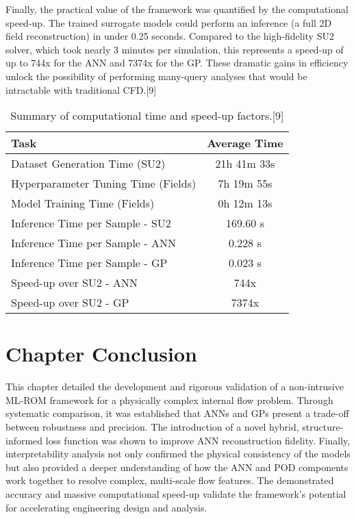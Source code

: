 \documentclass[12pt, a4paper]{report}
\begin{document}
Finally, the practical value of the framework was quantified by the computational speed-up. The trained surrogate models could perform an inference (a full 2D field reconstruction) in under 0.25 seconds. Compared to the high-fidelity SU2 solver, which took nearly 3 minutes per simulation, this represents a speed-up of up to 744x for the ANN and 7374x for the GP. These dramatic gains in efficiency unlock the possibility of performing many-query analyses that would be intractable with traditional CFD.[9]

\begin{table}[htbp]
\centering
\caption{Summary of computational time and speed-up factors.[9]}
\label{tab:nozzle_speedup}
\begin{tabular}{@{}lc@{}}
\toprule
Task & Average Time \\
\midrule
Dataset Generation Time (SU2) & 21h 41m 33s \\
Hyperparameter Tuning Time (Fields) & 7h 19m 55s \\
Model Training Time (Fields) & 0h 12m 13s \\
\midrule
Inference Time per Sample - SU2 & 169.60 s \\
Inference Time per Sample - ANN & 0.228 s \\
Inference Time per Sample - GP & 0.023 s \\
\midrule
Speed-up over SU2 - ANN & 744x \\
Speed-up over SU2 - GP & 7374x \\
\bottomrule
\end{tabular}
\end{table}

\section{Chapter Conclusion}
This chapter detailed the development and rigorous validation of a non-intrusive ML-ROM framework for a physically complex internal flow problem. Through systematic comparison, it was established that ANNs and GPs present a trade-off between robustness and precision. The introduction of a novel hybrid, structure-informed loss function was shown to improve ANN reconstruction fidelity. Finally, interpretability analysis not only confirmed the physical consistency of the models but also provided a deeper understanding of how the ANN and POD components work together to resolve complex, multi-scale flow features. The demonstrated accuracy and massive computational speed-up validate the framework's potential for accelerating engineering design and analysis.
\end{document}
